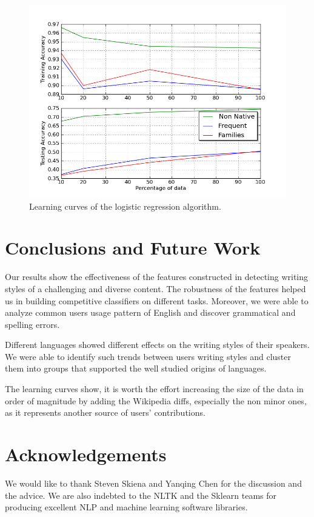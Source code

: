 \documentclass[10pt,a5paper,twoside]{article}
\begin{document}
\begin{figure}[t]
\centering
\includegraphics[scale=0.45]{combined_lc.png}
\caption{Learning curves of the logistic regression algorithm.}
\label{comb_lc}
\end{figure}


\section*{Conclusions and Future Work}
\label{conc}

Our results show the effectiveness of the features constructed in detecting writing styles
of a challenging and diverse content. The robustness of the features helped us
in building competitive classifiers on different tasks. Moreover, we were able
to analyze common users usage pattern of English and discover grammatical and
spelling errors.

Different languages showed different effects on the writing styles of their
speakers. We were able to identify such trends between users writing styles and
cluster them into groups that supported the well studied origins of languages.

The learning curves show, it is worth the effort increasing the size
of the data in order of magnitude by adding the Wikipedia diffs, especially the
non minor ones, as it represents another source of users' contributions.

\section*{Acknowledgements}
We would like to thank Steven Skiena and Yanqing Chen for the discussion and the advice.
We are also indebted to the NLTK and the Sklearn teams for producing excellent
NLP and machine learning software libraries.

\newpage
{}

\end{document}
